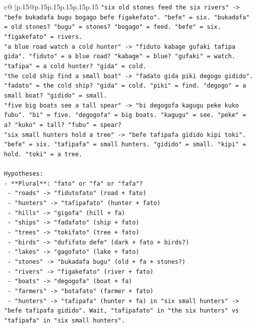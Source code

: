 \documentclass{article}
\begin{document}
{\begin{supertabular}{c@{$\;$}|p{.15\linewidth}@{}p{.15\linewidth}p{.15\linewidth}p{.15\linewidth}p{.15\linewidth}p{.15\linewidth}}
{{{\texttt{"six old stones feed the six rivers" {-}> "befe bukadafa bugu bogago befe figakefato". "befe" = six. "bukadafa" = old stones? "bugu" = stones? "bogago" = feed. "befe" = six. "figakefato" = rivers.} \\
\texttt{"a blue road watch a cold hunter" {-}> "fiduto kabage gufaki tafipa gida". "fiduto" = a blue road? "kabage" = blue? "gufaki" = watch. "tafipa" = a cold hunter? "gida" = cold.} \\
\texttt{"the cold ship find a small boat" {-}> "fadato gida piki degogo gidido". "fadato" = the cold ship? "gida" = cold. "piki" = find. "degogo" = a small boat? "gidido" = small.} \\
\texttt{"five big boats see a tall spear" {-}> "bi degogofa kagugu peke kuko fubu". "bi" = five. "degogofa" = big boats. "kagugu" = see. "peke" = a? "kuko" = tall? "fubu" = spear?} \\
\texttt{"six small hunters hold a tree" {-}> "befe tafipafa gidido kipi toki". "befe" = six. "tafipafa" = small hunters. "gidido" = small. "kipi" = hold. "toki" = a tree.} \\
\\ 
\texttt{Hypotheses:} \\
\texttt{{-} **Plural**: "fato" or "fa" or "fafa"?} \\
\texttt{  {-} "roads" {-}> "fidutofato" (road + fato)} \\
\texttt{  {-} "hunters" {-}> "tafipafato" (hunter + fato)} \\
\texttt{  {-} "hills" {-}> "gigofa" (hill + fa)} \\
\texttt{  {-} "ships" {-}> "fadafato" (ship + fato)} \\
\texttt{  {-} "trees" {-}> "tokifato" (tree + fato)} \\
\texttt{  {-} "birds" {-}> "dufifato defe" (dark + fato + birds?)} \\
\texttt{  {-} "lakes" {-}> "gagofato" (lake + fato)} \\
\texttt{  {-} "stones" {-}> "bukadafa bugu" (old + fa + stones?)} \\
\texttt{  {-} "rivers" {-}> "figakefato" (river + fato)} \\
\texttt{  {-} "boats" {-}> "degogofa" (boat + fa)} \\
\texttt{  {-} "farmers" {-}> "botafato" (farmer + fato)} \\
\texttt{  {-} "hunters" {-}> "tafipafa" (hunter + fa) in "six small hunters" {-}> "befe tafipafa gidido". Wait, "tafipafato" in "the six hunters" vs "tafipafa" in "six small hunters".} \\
}}}
\end{supertabular}}
\end{document}
